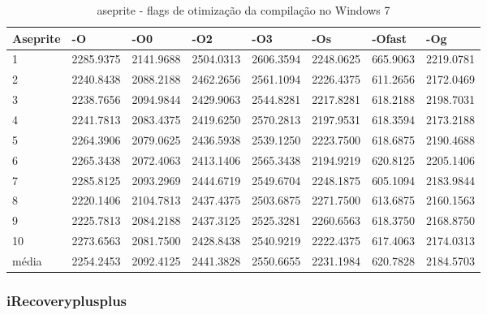 \begin{table}[!ht]
\centering
\caption{aseprite - flags de otimização da compilação no Windows 7}
\label{tab:otimizacao_compilacao:windows:aseprite}
\begin{tabular}{llllllll}
\textbf{Aseprite} & \textbf{-O}  & \textbf{-O0}   & \textbf{-O2} & \textbf{-O3} & \textbf{-Os} & \textbf{-Ofast} & \textbf{-Og} \\ \toprule
1                 &  2285.9375   &  2141.9688     & 2504.0313    &  2606.3594   &  2248.0625   & 665.9063        &  2219.0781   \\ 
2                 &  2240.8438   &  2088.2188     & 2462.2656    &  2561.1094   &  2226.4375   & 611.2656        &  2172.0469   \\ 
3                 &  2238.7656   &  2094.9844     & 2429.9063    &  2544.8281   &  2217.8281   & 618.2188        &  2198.7031   \\ 
4                 &  2241.7813   &  2083.4375     & 2419.6250    &  2570.2813   &  2197.9531   & 618.3594        &  2173.2188   \\ 
5                 &  2264.3906   &  2079.0625     & 2436.5938    &  2539.1250   &  2223.7500   & 618.6875        &  2190.4688   \\ 
6                 &  2265.3438   &  2072.4063     & 2413.1406    &  2565.3438   &  2194.9219   & 620.8125        &  2205.1406   \\ 
7                 &  2285.8125   &  2093.2969     & 2444.6719    &  2549.6704   &  2248.1875   & 605.1094        &  2183.9844   \\ 
8                 &  2220.1406   &  2104.7813     & 2437.4375    &  2503.6875   &  2271.7500   & 613.6875        &  2160.1563   \\ 
9                 &  2225.7813   &  2084.2188     & 2437.3125    &  2525.3281   &  2260.6563   & 618.3750        &  2168.8750   \\ 
10                &  2273.6563   &  2081.7500     & 2428.8438    &  2540.9219   &  2222.4375   & 617.4063        &  2174.0313   \\ \bottomrule
média             &  2254.2453   &  2092.4125     & 2441.3828    &  2550.6655   &  2231.1984   & 620.7828        &  2184.5703   \\ 
\end{tabular}
\end{table}

\clearpage
\subsubsection*{iRecoveryplusplus}

